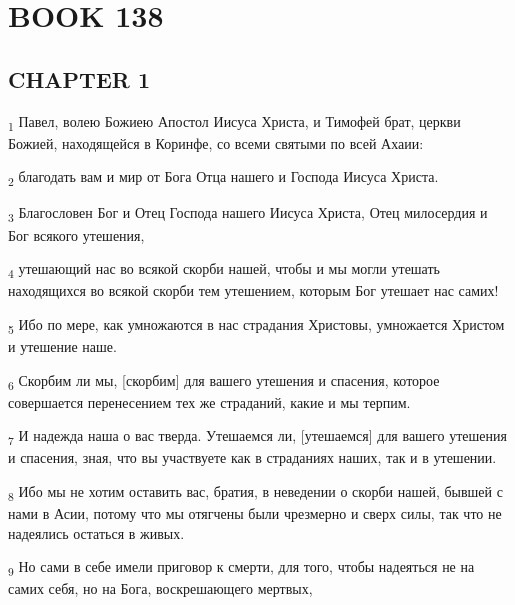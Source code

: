 \section{BOOK 138}
\subsection{CHAPTER 1}
\begin{tcolorbox}
\textsubscript{1} Павел, волею Божиею Апостол Иисуса Христа, и Тимофей брат, церкви Божией, находящейся в Коринфе, со всеми святыми по всей Ахаии:
\end{tcolorbox}
\begin{tcolorbox}
\textsubscript{2} благодать вам и мир от Бога Отца нашего и Господа Иисуса Христа.
\end{tcolorbox}
\begin{tcolorbox}
\textsubscript{3} Благословен Бог и Отец Господа нашего Иисуса Христа, Отец милосердия и Бог всякого утешения,
\end{tcolorbox}
\begin{tcolorbox}
\textsubscript{4} утешающий нас во всякой скорби нашей, чтобы и мы могли утешать находящихся во всякой скорби тем утешением, которым Бог утешает нас самих!
\end{tcolorbox}
\begin{tcolorbox}
\textsubscript{5} Ибо по мере, как умножаются в нас страдания Христовы, умножается Христом и утешение наше.
\end{tcolorbox}
\begin{tcolorbox}
\textsubscript{6} Скорбим ли мы, [скорбим] для вашего утешения и спасения, которое совершается перенесением тех же страданий, какие и мы терпим.
\end{tcolorbox}
\begin{tcolorbox}
\textsubscript{7} И надежда наша о вас тверда. Утешаемся ли, [утешаемся] для вашего утешения и спасения, зная, что вы участвуете как в страданиях наших, так и в утешении.
\end{tcolorbox}
\begin{tcolorbox}
\textsubscript{8} Ибо мы не хотим оставить вас, братия, в неведении о скорби нашей, бывшей с нами в Асии, потому что мы отягчены были чрезмерно и сверх силы, так что не надеялись остаться в живых.
\end{tcolorbox}
\begin{tcolorbox}
\textsubscript{9} Но сами в себе имели приговор к смерти, для того, чтобы надеяться не на самих себя, но на Бога, воскрешающего мертвых,
\end{tcolorbox}
